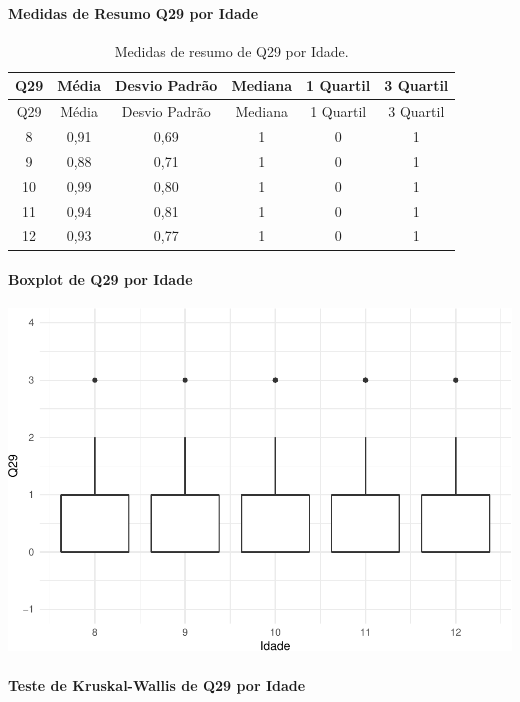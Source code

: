\documentclass[]{article}
\let\oldparagraph\paragraph
\renewcommand{\paragraph}[1]{\oldparagraph{#1}\mbox{}}
\begin{document}
\cleardoublepage

\hypertarget{medidas-de-resumo-q29-por-idade}{%
\paragraph{Medidas de Resumo Q29 por Idade}\label{medidas-de-resumo-q29-por-idade}}

\begin{longtable}[]{@{}cccccc@{}}
\caption{\label{tab:unnamed-chunk-922}Medidas de resumo de Q29 por Idade.}\tabularnewline
\toprule
Q29 & Média & Desvio Padrão & Mediana & 1 Quartil & 3 Quartil\tabularnewline
\midrule
\endfirsthead
\toprule
Q29 & Média & Desvio Padrão & Mediana & 1 Quartil & 3 Quartil\tabularnewline
\midrule
\endhead
8 & 0,91 & 0,69 & 1 & 0 & 1\tabularnewline
9 & 0,88 & 0,71 & 1 & 0 & 1\tabularnewline
10 & 0,99 & 0,80 & 1 & 0 & 1\tabularnewline
11 & 0,94 & 0,81 & 1 & 0 & 1\tabularnewline
12 & 0,93 & 0,77 & 1 & 0 & 1\tabularnewline
\bottomrule
\end{longtable}

\hypertarget{boxplot-de-q29-por-idade}{%
\paragraph{Boxplot de Q29 por Idade}\label{boxplot-de-q29-por-idade}}

\begin{center}\includegraphics[width=0.75\linewidth]{relatorio_covid19_files/figure-latex/unnamed-chunk-923-1} \end{center}

\hypertarget{teste-de-kruskal-wallis-de-q29-por-idade}{%
\paragraph{Teste de Kruskal-Wallis de Q29 por Idade}\label{teste-de-kruskal-wallis-de-q29-por-idade}}
\end{document}
